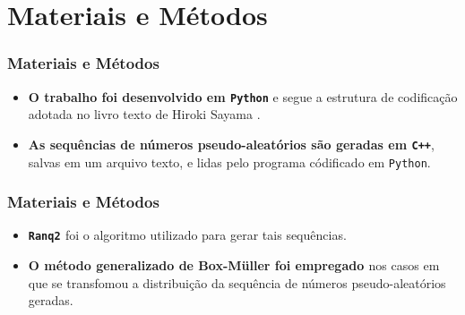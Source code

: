 
\section{Materiais e Métodos}

\begin{frame}
  \frametitle{Materiais e Métodos}

  \begin{alertblock}{}
    \vspace{5mm}

    \begin{itemize}
      \item \alert{\textbf{O trabalho foi desenvolvido em \texttt{Python}}} e
        segue a estrutura de codificação adotada no livro texto de Hiroki Sayama
        \cite{Sayama:2015:ComplexSystems}.
      \vspace{5mm}

      \item \alert{\textbf{As sequências de números pseudo-aleatórios são
        geradas em \texttt{C++}}}, salvas em um arquivo texto, e lidas pelo
        programa códificado em \texttt{Python}.
      \vspace{5mm}

    \end{itemize}
  \end{alertblock}
\end{frame}

\begin{frame}
  \frametitle{Materiais e Métodos}

  \begin{alertblock}{}
    \vspace{5mm}

    \begin{itemize}
      \item \alert{\textbf{\texttt{Ranq2} \cite{Press:Numerical:Recipes}}} foi
        o algoritmo utilizado para gerar tais sequências.
      \vspace{5mm}

      \item \alert{\textbf{O método generalizado de Box-Müller foi empregado
        \cite{Tsallis:2007:GeneralizedBoxMuller}}} nos casos em que se
        transfomou a distribuição da sequência de números pseudo-aleatórios
        geradas.
      \vspace{5mm}

    \end{itemize}
  \end{alertblock}
\end{frame}
